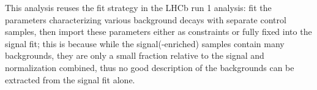 
This analysis reuses the fit strategy in the LHCb \RDX run 1 analysis:
fit the parameters characterizing various background decays with separate
control samples, then import these parameters either as constraints or fully
fixed into the signal fit;
this is because while the signal(-enriched) samples contain many backgrounds,
they are only a small fraction relative to the signal and normalization
combined,
thus no good description of the backgrounds can be extracted from the signal fit
alone.

